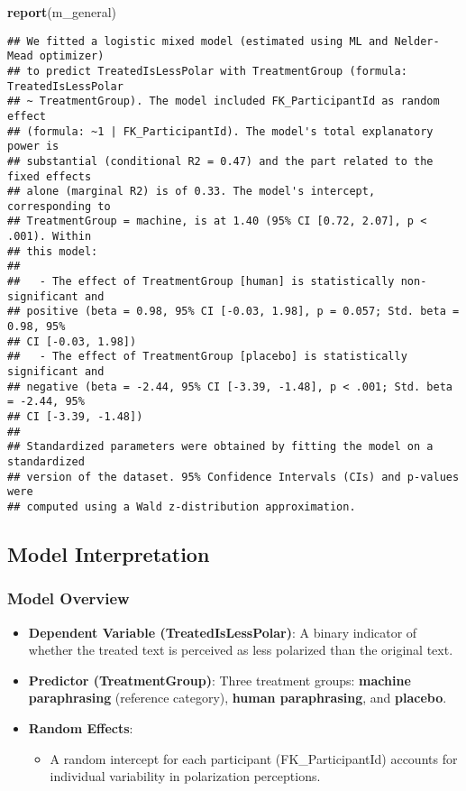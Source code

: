 \documentclass[
]{article}
\newenvironment{Shaded}{\begin{snugshade}}{\end{snugshade}}
\newcommand{\FunctionTok}[1]{\textcolor[rgb]{0.13,0.29,0.53}{\textbf{#1}}}
\newcommand{\NormalTok}[1]{#1}
\providecommand{\tightlist}{%
  \setlength{\itemsep}{0pt}\setlength{\parskip}{0pt}}
\begin{document}
\begin{Shaded}
\begin{Highlighting}[]
\FunctionTok{report}\NormalTok{(m\_general)}
\end{Highlighting}
\end{Shaded}

\begin{verbatim}
## We fitted a logistic mixed model (estimated using ML and Nelder-Mead optimizer)
## to predict TreatedIsLessPolar with TreatmentGroup (formula: TreatedIsLessPolar
## ~ TreatmentGroup). The model included FK_ParticipantId as random effect
## (formula: ~1 | FK_ParticipantId). The model's total explanatory power is
## substantial (conditional R2 = 0.47) and the part related to the fixed effects
## alone (marginal R2) is of 0.33. The model's intercept, corresponding to
## TreatmentGroup = machine, is at 1.40 (95% CI [0.72, 2.07], p < .001). Within
## this model:
## 
##   - The effect of TreatmentGroup [human] is statistically non-significant and
## positive (beta = 0.98, 95% CI [-0.03, 1.98], p = 0.057; Std. beta = 0.98, 95%
## CI [-0.03, 1.98])
##   - The effect of TreatmentGroup [placebo] is statistically significant and
## negative (beta = -2.44, 95% CI [-3.39, -1.48], p < .001; Std. beta = -2.44, 95%
## CI [-3.39, -1.48])
## 
## Standardized parameters were obtained by fitting the model on a standardized
## version of the dataset. 95% Confidence Intervals (CIs) and p-values were
## computed using a Wald z-distribution approximation.
\end{verbatim}

\subsection{\texorpdfstring{\textbf{Model
Interpretation}}{Model Interpretation}}\label{model-interpretation}

\subsubsection{\texorpdfstring{\textbf{Model
Overview}}{Model Overview}}\label{model-overview}

\begin{itemize}
\tightlist
\item
  \textbf{Dependent Variable (TreatedIsLessPolar)}: A binary indicator
  of whether the treated text is perceived as less polarized than the
  original text.
\item
  \textbf{Predictor (TreatmentGroup)}: Three treatment groups:
  \textbf{machine paraphrasing} (reference category), \textbf{human
  paraphrasing}, and \textbf{placebo}.
\item
  \textbf{Random Effects}:

  \begin{itemize}
  \tightlist
  \item
    A random intercept for each participant (FK\_ParticipantId) accounts
    for individual variability in polarization perceptions.
  \end{itemize}
\end{itemize}
\end{document}
